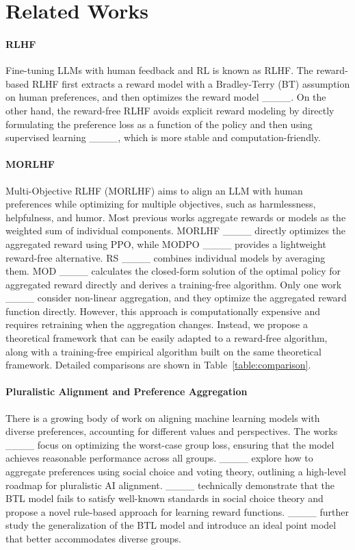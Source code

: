 \section{Related Works}
\paragraph{RLHF}
Fine-tuning LLMs with human feedback and RL is known as RLHF. The reward-based RLHF first extracts a reward model with a Bradley-Terry (BT) assumption on human preferences, and then optimizes the reward model ____. On the other hand, the reward-free RLHF avoids explicit reward modeling by directly formulating the preference loss as a function of the policy and then using supervised learning ____, which is more stable and computation-friendly. 
\paragraph{MORLHF}
Multi-Objective RLHF (MORLHF) aims to align an LLM with human preferences while optimizing for multiple objectives, such as harmlessness, helpfulness, and humor. Most previous works aggregate rewards or models as the weighted sum of individual components. MORLHF ____ directly optimizes the aggregated reward using PPO, while MODPO ____ provides a lightweight reward-free alternative. RS ____ combines individual models by averaging them. MOD ____ calculates the closed-form solution of the optimal policy for aggregated reward directly and derives a training-free algorithm. Only one work ____ consider non-linear aggregation, and they optimize the aggregated reward function directly. However, this approach is computationally expensive and requires retraining when the aggregation changes. Instead, we propose a theoretical framework that can be easily adapted to a reward-free algorithm,  along with a training-free empirical algorithm built on the same theoretical framework. Detailed comparisons are shown in Table~\ref{table:comparison}.

\paragraph{Pluralistic Alignment and Preference Aggregation}
There is a growing body of work on aligning machine learning models with diverse preferences, accounting for different values and perspectives.  The works ____ focus on optimizing the worst-case group loss, ensuring that the model achieves reasonable performance across all groups. ____ explore how to aggregate preferences using social choice and voting theory, outlining a high-level roadmap for pluralistic AI alignment. ____ technically demonstrate that the BTL model fails to satisfy well-known standards in social choice theory and propose a novel rule-based approach for learning reward functions. ____ further study the generalization of the BTL model and introduce an ideal point model that better accommodates diverse groups.

